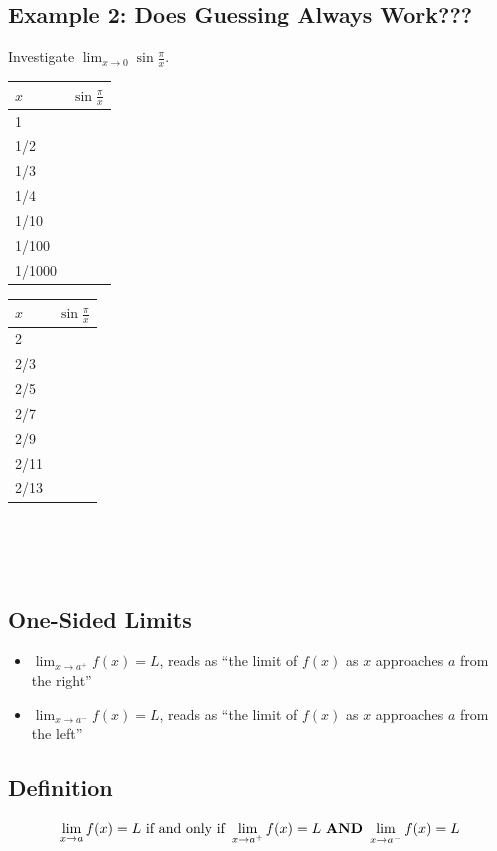 \documentclass[10pt]{book}
\theoremstyle{definition}
\begin{document}
\subsection*{Example 2: Does Guessing Always Work???}
Investigate $\displaystyle \lim_{x\rightarrow 0}\sin\frac{\pi}{x}$.\\
\begin{table}[h!]
    \centering
    \begin{tabular}{l|c}
        $x$&$\sin\frac{\pi}{x}$  \\
        \hline
        1 & \\[8pt]
        1/2 & \\[8pt]
        1/3 & \\[8pt]
        1/4 & \\[8pt]
        1/10 & \\[8pt]
        1/100 & \\[8pt]
        1/1000 & 
    \end{tabular}
    \quad
    \hspace{1in}
    \begin{tabular}{l|c}
        $x$&$\sin\frac{\pi}{x}$  \\
        \hline
        2 & \\[8pt]
        2/3 & \\[8pt]
        2/5 & \\[8pt]
        2/7 & \\[8pt]
        2/9 & \\[8pt]
        2/11 & \\[8pt]
        2/13 & 
    \end{tabular}
\end{table}
\\ \\ \\
\begin{tcolorbox}
\subsection*{One-Sided Limits}
\begin{itemize}
    \item $\displaystyle\lim_{x\rightarrow a^+}f(x)=L$, reads as ``the limit of $f(x)$ as $x$ approaches $a$ from the right''
    \item $\displaystyle\lim_{x\rightarrow a^-}f(x)=L$, reads as ``the limit of $f(x)$ as $x$ approaches $a$ from the left''
\end{itemize}
\subsection*{Definition}
\[
\lim_{x\rightarrow a}f(x)=L \textrm{ if and only if } \lim_{x\rightarrow a^+}f(x)=L\textrm{  \textbf{AND} }\lim_{x\rightarrow a^-}f(x)=L
\]
\end{tcolorbox}
\end{document}
